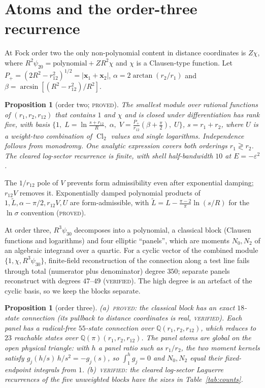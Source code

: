 \documentclass[aps,pra,twocolumn,superscriptaddress,nofootinbib]{revtex4-2}
\newtheorem{proposition}[theorem]{Proposition}
\theoremstyle{remark}
\newcommand{\Cl}{\operatorname{Cl}_2}
\newcommand{\lab}[1]{\textup{\textsc{#1}}}
\begin{document}
\section{Atoms and the order-three recurrence}
At Fock order two the only non-polynomial content in distance coordinates is $Z\chi$, where $R^2\psi_{20}=\text{polynomial}+ZR^2\chi$ and $\chi$ is a Clausen-type function.
Let $P_{+}=(2R^2-r_{12}^2)^{1/2}=|\mathbf x_1+\mathbf x_2|$, $\alpha=2\arctan(r_2/r_1)$ and $\beta=\arcsin[(R^2-r_{12}^2)/R^2]$.
\begin{proposition}[order two; \lab{proved}]\label{prop:order2}
The smallest module over rational functions of $(r_1,r_2,r_{12})$ that contains $1$ and $\chi$ and is closed under differentiation has rank five, with basis
$\{1,\;L=\ln\tfrac{s+r_{12}}{R},\;\alpha,\;V=\tfrac{P_+}{r_{12}}(\beta+\tfrac\pi2),\;U\}$, $s=r_1+r_2$, where $U$ is a weight-two combination of $\Cl$ values and single logarithms.
Independence follows from monodromy.
One analytic expression covers both orderings $r_1\gtrless r_2$.
The cleared log-sector recurrence is finite, with shell half-bandwidth $10$ at $E=-\varepsilon^2$.
\end{proposition}
\noindent
The $1/r_{12}$ pole of $V$ prevents form admissibility even after exponential damping; $r_{12}V$ removes it.
Exponentially damped polynomial products of $1,\tilde L,\alpha-\pi/2,r_{12}V,U$ are form-admissible, with $\tilde L=L-\frac{\pi-2}{\pi}\ln(s/R)$ for the $\ln\sigma$ convention (\lab{proved}).

At order three, $R^3\psi_{30}$ decomposes into a polynomial, a classical block (Clausen functions and logarithms) and four elliptic ``panels'', which are moments $N_0,N_2$ of an algebraic integrand over a quartic.
For a cyclic vector of the combined module $\{1,\chi,R^3\psi_{30}\}$, finite-field reconstruction of the connection along a test line fails through total (numerator plus denominator) degree $350$; separate panels reconstruct with degrees $47$--$49$ (\lab{verified}).
The high degree is an artefact of the cyclic basis, so we keep the blocks separate.
\begin{proposition}[order three]\label{prop:order3}
(a)~\lab{proved}: the classical block has an exact $18$-state connection (its pullback to distance coordinates is real, \lab{verified}).
Each panel has a radical-free $55$-state connection over $\mathbb Q(r_1,r_2,r_{12})$, which reduces to $23$ reachable states over $\mathbb Q(\pi)(r_1,r_2,r_{12})$.
The panel atoms are global on the open physical triangle: with $h$ a panel ratio such as $r_1/r_2$, the two moment kernels satisfy $g_j(h/s)\,h/s^2=-g_j(s)$, so $\int_1^hg_j=0$ and $N_0,N_2$ equal their fixed-endpoint integrals from $1$.
(b)~\lab{verified}: the cleared log-sector Laguerre recurrences of the five unweighted blocks have the sizes in Table~\ref{tab:counts}.
\end{proposition}
\end{document}
